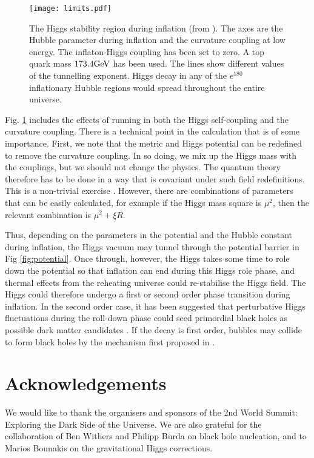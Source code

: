 \documentclass{PoS}
\begin{document}
\begin{figure}
\centering
\texttt{[image: limits.pdf]}
\caption{The Higgs stability region during inflation (from  \cite{Bounakis:2017fkv} ). 
The axes are the Hubble parameter
during inflation and the curvature coupling at low energy. The
inflaton-Higgs coupling has been set to zero.
A top quark mass $173.4{\rm GeV}$ has been used.
The lines show different values of the tunnelling exponent. Higgs decay in any of the $e^{180}$ 
inflationary Hubble regions would spread throughout the entire universe.
} \label{fig:limits}
\end{figure}

Fig. \ref{fig:limits} includes the effects of running in both the Higgs self-coupling and the curvature
coupling. There is a technical point in the calculation that is of some importance. First, we note
that the metric and Higgs potential can be redefined to remove the curvature coupling.
In so doing, we mix up the Higgs mass with the couplings, but we should not change
the physics. The quantum theory therefore has to be done in a way that is covariant under
such field redefinitions. This is a non-trivial exercise \cite{Bounakis:2017fkv}. However, there are combinations of
parameters that can be easily calculated, for example if the Higgs mass square is $\mu^2$,
then the relevant combination is $\mu^2+\xi R$.

Thus, depending on the parameters in the potential and the Hubble constant  during inflation, the
Higgs vacuum may tunnel through the potential barrier in Fig \ref{fig:potential}. Once through, 
however, the Higgs
takes some time to role down the potential so that inflation can end during this Higgs role phase,
and thermal effects from the reheating universe could re-stabilise the Higgs field. The Higgs could
therefore undergo a first or second order phase transition during inflation. In
 the second order case, it has been suggested that perturbative Higgs fluctuations during the 
 roll-down phase could seed primordial black holes as possible dark matter candidates
 \cite{Espinosa:2017sgp}. If the decay is first order, bubbles may collide to form black holes 
 by the mechanism first proposed in \cite{PhysRevD.26.2681,Kodama:1982sf}.
 
 \section{Acknowledgements}
 
We would like to thank the organisers and sponsors of the 2nd World Summit: Exploring the Dark 
Side of the Universe. We are also grateful for the collaboration of Ben Withers and Philipp Burda
on black hole nucleation, and to Marios Bounakis on the gravitational Higgs
corrections. 
\end{document}
